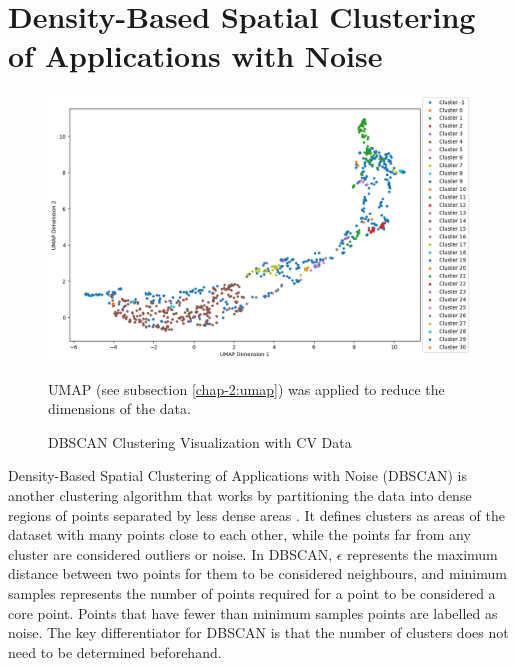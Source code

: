 \section{Density-Based Spatial Clustering of Applications with Noise}
\begin{figure}[!h]
  \centering
    \includegraphics[width=1.0\textwidth]{figures/dbscan.png}
    \caption{DBSCAN Clustering Visualization with CV Data}
    \label{dbscan}
    UMAP (see subsection \ref{chap-2:umap}) was applied to reduce the dimensions of the data.
\end{figure}
Density-Based Spatial Clustering of Applications with Noise (DBSCAN) is another clustering algorithm that works by partitioning the data into dense regions of points separated by less dense areas \cite{Ester1996ADA}. It defines clusters as areas of the dataset with many points close to each other, while the points far from any cluster are considered outliers or noise. In DBSCAN, $\epsilon$ represents the maximum distance between two points for them to be considered neighbours, and minimum samples represents the number of points required for a point to be considered a core point. Points that have fewer than minimum samples points are labelled as noise. The key differentiator for DBSCAN is that the number of clusters does not need to be determined beforehand.  
